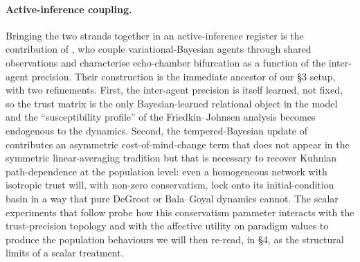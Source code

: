 \paragraph{Active-inference coupling.}
Bringing the two strands together in an active-inference register is
the contribution of \citet{albarracin2022EpistemicCommunities}, who
couple variational-Bayesian agents through shared observations and
characterise echo-chamber bifurcation as a function of the
inter-agent precision. Their construction is the immediate ancestor
of our §3 setup, with two refinements. First, the inter-agent
precision is itself learned, not fixed, so the trust matrix is the
only Bayesian-learned relational object in the model and the
``susceptibility profile'' of the Friedkin--Johnsen analysis becomes
endogenous to the dynamics. Second, the tempered-Bayesian update of
\citet{hylandAlbarracin2025MindChange} contributes an asymmetric
cost-of-mind-change term that does not appear in the symmetric
linear-averaging tradition but that is necessary to recover Kuhnian
path-dependence at the population level: even a homogeneous network
with isotropic trust will, with non-zero conservatism, lock onto its
initial-condition basin in a way that pure DeGroot or Bala--Goyal
dynamics cannot. The scalar experiments that follow probe how this
conservatism parameter interacts with the trust-precision topology
and with the affective utility on paradigm values to produce the
population behaviours we will then re-read, in §4, as the structural
limits of a scalar treatment.
